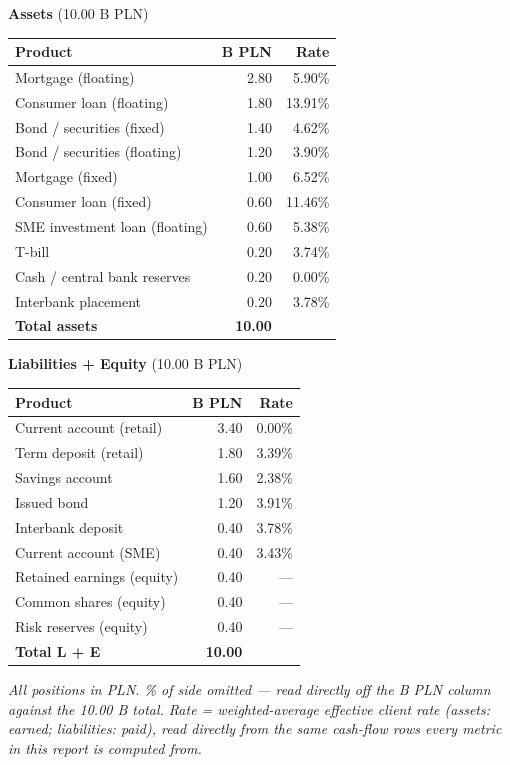 \documentclass[11pt,a4paper]{article}
\begin{document}
\begin{center}
\small
\begin{minipage}[t]{0.5\textwidth}
\centering
\textbf{Assets} \quad(10.00 B PLN)\\[4pt]
\begin{tabular}{@{}>{\raggedright\arraybackslash}p{4.3cm}rr@{}}
\toprule
Product & B PLN & Rate \\
\midrule
Mortgage (floating)            & 2.80  & 5.90\% \\
Consumer loan (floating)       & 1.80  & 13.91\% \\
Bond / securities (fixed)      & 1.40  & 4.62\% \\
Bond / securities (floating)   & 1.20  & 3.90\% \\
Mortgage (fixed)                & 1.00  & 6.52\% \\
Consumer loan (fixed)          & 0.60  & 11.46\% \\
SME investment loan (floating) & 0.60  & 5.38\% \\
T-bill                         & 0.20  & 3.74\% \\
Cash / central bank reserves   & 0.20  & 0.00\% \\
Interbank placement            & 0.20  & 3.78\% \\
\midrule
\textbf{Total assets} & \textbf{10.00} & \\
\bottomrule
\end{tabular}
\end{minipage}\hfill
\begin{minipage}[t]{0.47\textwidth}
\centering
\textbf{Liabilities + Equity} \quad(10.00 B PLN)\\[4pt]
\begin{tabular}{@{}>{\raggedright\arraybackslash}p{4.0cm}rr@{}}
\toprule
Product & B PLN & Rate \\
\midrule
Current account (retail) & 3.40 & 0.00\% \\
Term deposit (retail)    & 1.80 & 3.39\% \\
Savings account          & 1.60 & 2.38\% \\
Issued bond               & 1.20 & 3.91\% \\
Interbank deposit        & 0.40 & 3.78\% \\
Current account (SME)    & 0.40 & 3.43\% \\
\midrule
Retained earnings (equity)  & 0.40 & --- \\
Common shares (equity)      & 0.40 & --- \\
Risk reserves (equity)      & 0.40 & --- \\
\midrule
\textbf{Total L + E} & \textbf{10.00} & \\
\bottomrule
\end{tabular}
\end{minipage}
\end{center}
\small\color{labgrey}\textit{All positions in PLN. \% of side omitted --- read directly off the B PLN column against the 10.00 B total. Rate = weighted-average effective client rate (assets: earned; liabilities: paid), read directly from the same cash-flow rows every metric in this report is computed from.}
\normalsize\color{black}
\end{document}
